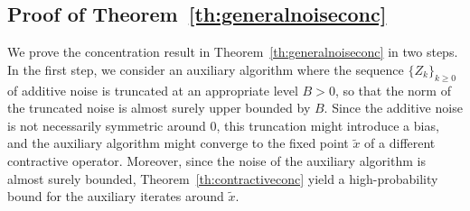 \documentclass{article}
\newcommand{\lrp}[1]{\left( #1 \right)}
\newcommand{\lrs}[1]{\left[ #1 \right]}
\newcommand{\N}{\mathbb{N}}
\newtheorem{corollary}{Corollary}[theorem]
\begin{document}

\subsection{Proof of Theorem~\ref{th:generalnoiseconc}}\label{sec:proof_th:generalnoiseconc}

We prove the concentration result in Theorem~\ref{th:generalnoiseconc} in two steps. In the first step, we consider an auxiliary algorithm where the sequence $\{Z_k\}_{k\geq 0}$ of additive noise is truncated at an appropriate level $B>0$, so that the norm of the truncated noise is almost surely upper bounded by $B$. Since the additive noise is not necessarily symmetric around $0$, this truncation might introduce a bias, and the auxiliary algorithm might converge to the fixed point $\tilde{x}$ of a different contractive operator.  Moreover, since the noise of the auxiliary algorithm is almost surely bounded, Theorem~\ref{th:contractiveconc} yield a high-probability bound for the auxiliary iterates around $\tilde{x}$. 
\end{document}
